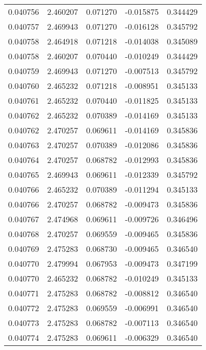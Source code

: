 \begin{tabular}{lrrrr}
0.040756    &  2.460207 &  0.071270 & -0.015875 &             0.344429 \\
0.040757    &  2.469943 &  0.071270 & -0.016128 &             0.345792 \\
0.040758    &  2.464918 &  0.071218 & -0.014038 &             0.345089 \\
0.040758    &  2.460207 &  0.070440 & -0.010249 &             0.344429 \\
0.040759    &  2.469943 &  0.071270 & -0.007513 &             0.345792 \\
0.040760    &  2.465232 &  0.071218 & -0.008951 &             0.345133 \\
0.040761    &  2.465232 &  0.070440 & -0.011825 &             0.345133 \\
0.040762    &  2.465232 &  0.070389 & -0.014169 &             0.345133 \\
0.040762    &  2.470257 &  0.069611 & -0.014169 &             0.345836 \\
0.040763    &  2.470257 &  0.070389 & -0.012086 &             0.345836 \\
0.040764    &  2.470257 &  0.068782 & -0.012993 &             0.345836 \\
0.040765    &  2.469943 &  0.069611 & -0.012339 &             0.345792 \\
0.040766    &  2.465232 &  0.070389 & -0.011294 &             0.345133 \\
0.040766    &  2.470257 &  0.068782 & -0.009473 &             0.345836 \\
0.040767    &  2.474968 &  0.069611 & -0.009726 &             0.346496 \\
0.040768    &  2.470257 &  0.069559 & -0.009465 &             0.345836 \\
0.040769    &  2.475283 &  0.068730 & -0.009465 &             0.346540 \\
0.040770    &  2.479994 &  0.067953 & -0.009473 &             0.347199 \\
0.040770    &  2.465232 &  0.068782 & -0.010249 &             0.345133 \\
0.040771    &  2.475283 &  0.068782 & -0.008812 &             0.346540 \\
0.040772    &  2.475283 &  0.069559 & -0.006991 &             0.346540 \\
0.040773    &  2.475283 &  0.068782 & -0.007113 &             0.346540 \\
0.040774    &  2.475283 &  0.069611 & -0.006329 &             0.346540 \\

\end{tabular}
